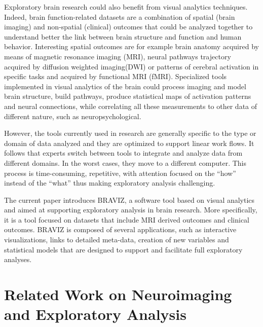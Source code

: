 \documentclass[twocolumn]{svjour3}
\begin{document}
Exploratory brain research  could also benefit from visual analytics techniques. Indeed, brain function-related datasets are a combination of spatial (brain imaging) and non-spatial (clinical) outcomes that could be analyzed together to understand better the link between brain structure and function and human behavior. Interesting spatial outcomes are for example brain anatomy acquired by means of magnetic resonance imaging (MRI), neural pathways trajectory acquired by diffusion weighted imaging(DWI) or patterns of cerebral activation in specific tasks and acquired by functional MRI (fMRI). Specialized tools implemented in visual analytics of the brain could process imaging and model brain structure, build pathways, produce statistical maps of activation patterns and neural connections, while correlating all these measurements to other data of different nature, such as neuropsychological.

However, the tools currently used in research are generally specific to the type or domain of data analyzed and they are optimized to support linear work flows. It follows that experts switch between tools to integrate and analyze data from different domains. In the worst cases, they move to a different computer. This process is time-consuming, repetitive, with attention focused on the ``how'' instead of the ``what'' thus making exploratory analysis challenging.

The current paper introduces BRAVIZ, a software tool based on visual analytics and aimed at supporting exploratory analysis in brain research. More specifically, it is a tool focused on datasets that include MRI derived outcomes and clinical outcomes. BRAVIZ  is composed of several applications, such as interactive visualizations, links to detailed meta-data, creation of new variables and statistical models that are designed to support and facilitate full exploratory analyses.  

\section{Related Work on Neuroimaging and Exploratory Analysis}
\end{document}
